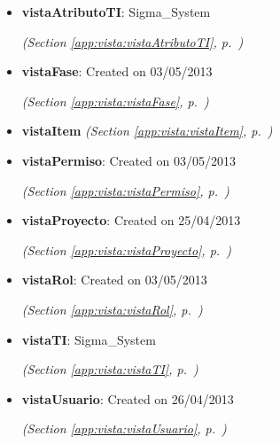\begin{itemize}
\setlength{\parskip}{0ex}
\item \textbf{vistaAtributoTI}: Sigma\_System



  \textit{(Section \ref{app:vista:vistaAtributoTI}, p.~\pageref{app:vista:vistaAtributoTI})}

\item \textbf{vistaFase}: Created on 03/05/2013



  \textit{(Section \ref{app:vista:vistaFase}, p.~\pageref{app:vista:vistaFase})}

\item \textbf{vistaItem}
  \textit{(Section \ref{app:vista:vistaItem}, p.~\pageref{app:vista:vistaItem})}

\item \textbf{vistaPermiso}: Created on 03/05/2013



  \textit{(Section \ref{app:vista:vistaPermiso}, p.~\pageref{app:vista:vistaPermiso})}

\item \textbf{vistaProyecto}: Created on 25/04/2013



  \textit{(Section \ref{app:vista:vistaProyecto}, p.~\pageref{app:vista:vistaProyecto})}

\item \textbf{vistaRol}: Created on 03/05/2013



  \textit{(Section \ref{app:vista:vistaRol}, p.~\pageref{app:vista:vistaRol})}

\item \textbf{vistaTI}: Sigma\_System



  \textit{(Section \ref{app:vista:vistaTI}, p.~\pageref{app:vista:vistaTI})}

\item \textbf{vistaUsuario}: Created on 26/04/2013



  \textit{(Section \ref{app:vista:vistaUsuario}, p.~\pageref{app:vista:vistaUsuario})}

\end{itemize}



